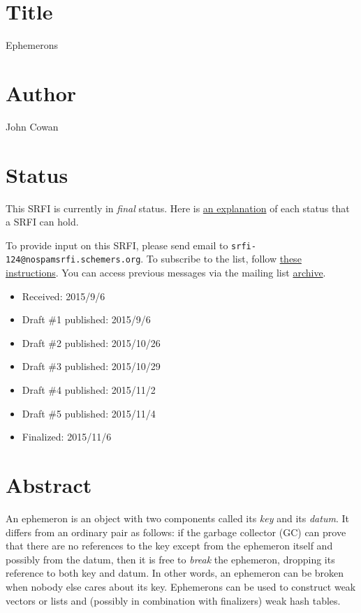 \section{Title}\label{title}

Ephemerons

\section{Author}\label{author}

John Cowan

\section{Status}\label{status}

This SRFI is currently in \emph{final} status. Here is
\href{http://srfi.schemers.org/srfi-process.html}{an explanation} of
each status that a SRFI can hold.

To provide input on this SRFI, please send email to
\texttt{srfi-124@nospamsrfi.schemers.org}. To subscribe to the list,
follow \href{http://srfi.schemers.org/srfi-list-subscribe.html}{these
instructions}. You can access previous messages via the mailing list
\href{http://srfi-email.schemers.org/srfi-124}{archive}.

\begin{itemize}
\tightlist
\item
  Received: 2015/9/6
\item
  Draft \#1 published: 2015/9/6
\item
  Draft \#2 published: 2015/10/26
\item
  Draft \#3 published: 2015/10/29
\item
  Draft \#4 published: 2015/11/2
\item
  Draft \#5 published: 2015/11/4
\item
  Finalized: 2015/11/6
\end{itemize}

\section{Abstract}\label{abstract}

An ephemeron is an object with two components called its \emph{key} and
its \emph{datum}. It differs from an ordinary pair as follows: if the
garbage collector (GC) can prove that there are no references to the key
except from the ephemeron itself and possibly from the datum, then it is
free to \emph{break} the ephemeron, dropping its reference to both key
and datum. In other words, an ephemeron can be broken when nobody else
cares about its key. Ephemerons can be used to construct weak vectors or
lists and (possibly in combination with finalizers) weak hash tables.

